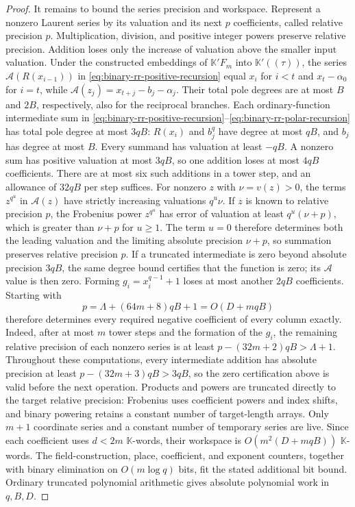 \documentclass[11pt,letterpaper]{article}
\numberwithin{equation}{section}
\begin{document}
\begin{proof}
It remains to bound the series precision and workspace.
Represent a nonzero Laurent series by its valuation and its next $p$ coefficients, called relative precision $p$.
Multiplication, division, and positive integer powers preserve relative precision.
Addition loses only the increase of valuation above the smaller input valuation.
Under the constructed embeddings of $\mathbb K'F_m$ into $\mathbb K'((\tau))$, the series $\mathcal A(R(x_{i-1}))$ in \eqref{eq:binary-rr-positive-recursion} equal $x_i$ for $i<t$ and $x_t-\alpha_0$ for $i=t$, while $\mathcal A(z_j)=x_{t+j}-b_j-\alpha_j$.
Their total pole degrees are at most $B$ and $2B$, respectively, also for the reciprocal branches.
Each ordinary-function intermediate sum in \eqref{eq:binary-rr-positive-recursion}--\eqref{eq:binary-rr-polar-recursion} has total pole degree at most $3qB$: $R(x_i)$ and $b_j^q$ have degree at most $qB$, and $b_j$ has degree at most $B$.
Every summand has valuation at least $-qB$.
A nonzero sum has positive valuation at most $3qB$, so one addition loses at most $4qB$ coefficients.
There are at most six such additions in a tower step, and an allowance of $32qB$ per step suffices.
For nonzero $z$ with $\nu=v(z)>0$, the terms $z^{q^u}$ in $\mathcal A(z)$ have strictly increasing valuations $q^u\nu$.
If $z$ is known to relative precision $p$, the Frobenius power $z^{q^u}$ has error of valuation at least $q^u(\nu+p)$, which is greater than $\nu+p$ for $u\ge1$.
The term $u=0$ therefore determines both the leading valuation and the limiting absolute precision $\nu+p$, so summation preserves relative precision $p$.
If a truncated intermediate is zero beyond absolute precision $3qB$, the same degree bound certifies that the function is zero; its $\mathcal A$ value is then zero.
Forming $g_i=x_i^{q-1}+1$ loses at most another $2qB$ coefficients.
Starting with
\begin{equation}
 p=\Lambda+(64m+8)qB+1=O(D+mqB)
 \label{eq:binary-rr-working-precision}
\end{equation}
therefore determines every required negative coefficient of every column exactly.
Indeed, after at most $m$ tower steps and the formation of the $g_i$, the remaining relative precision of each nonzero series is at least $p-(32m+2)qB>\Lambda+1$.
Throughout these computations, every intermediate addition has absolute precision at least $p-(32m+3)qB>3qB$, so the zero certification above is valid before the next operation.
Products and powers are truncated directly to the target relative precision: Frobenius uses coefficient powers and index shifts, and binary powering retains a constant number of target-length arrays.
Only $m+1$ coordinate series and a constant number of temporary series are live.
Since each coefficient uses $d<2m$ $\mathbb K$-words, their workspace is $O(m^2(D+mqB))$ $\mathbb K$-words.
The field-construction, place, coefficient, and exponent counters, together with binary elimination on $O(m\log q)$ bits, fit the stated additional bit bound.
Ordinary truncated polynomial arithmetic gives absolute polynomial work in $q,B,D$.


\end{proof}
\end{document}
